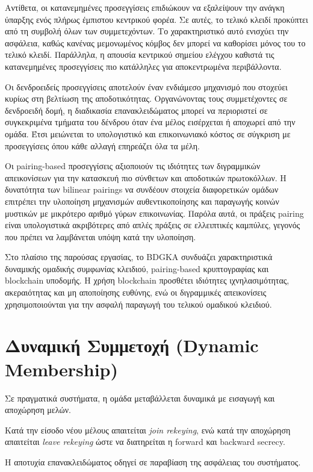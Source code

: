 \documentclass[12pt,a4paper]{report}
\begin{document}
Αντίθετα, οι κατανεμημένες προσεγγίσεις επιδιώκουν να εξαλείψουν την ανάγκη ύπαρξης ενός πλήρως έμπιστου κεντρικού φορέα. Σε αυτές, το τελικό κλειδί προκύπτει από τη συμβολή όλων των συμμετεχόντων. Το χαρακτηριστικό αυτό ενισχύει την ασφάλεια, καθώς κανένας μεμονωμένος κόμβος δεν μπορεί να καθορίσει μόνος του το τελικό κλειδί. Παράλληλα, η απουσία κεντρικού σημείου ελέγχου καθιστά τις κατανεμημένες προσεγγίσεις πιο κατάλληλες για αποκεντρωμένα περιβάλλοντα.

Οι δενδροειδείς προσεγγίσεις αποτελούν έναν ενδιάμεσο μηχανισμό που στοχεύει κυρίως στη βελτίωση της αποδοτικότητας. Οργανώνοντας τους συμμετέχοντες σε δενδροειδή δομή, η διαδικασία επανακλειδώματος μπορεί να περιοριστεί σε συγκεκριμένα τμήματα του δένδρου όταν ένα μέλος εισέρχεται ή αποχωρεί από την ομάδα. Έτσι μειώνεται το υπολογιστικό και επικοινωνιακό κόστος σε σύγκριση με προσεγγίσεις όπου κάθε αλλαγή επηρεάζει όλα τα μέλη.

Οι pairing-based προσεγγίσεις αξιοποιούν τις ιδιότητες των διγραμμικών απεικονίσεων για την κατασκευή πιο σύνθετων και αποδοτικών πρωτοκόλλων. Η δυνατότητα των bilinear pairings να συνδέουν στοιχεία διαφορετικών ομάδων επιτρέπει την υλοποίηση μηχανισμών αυθεντικοποίησης και παραγωγής κοινών μυστικών με μικρότερο αριθμό γύρων επικοινωνίας. Παρόλα αυτά, οι πράξεις pairing είναι υπολογιστικά ακριβότερες από απλές πράξεις σε ελλειπτικές καμπύλες, γεγονός που πρέπει να λαμβάνεται υπόψη κατά την υλοποίηση.

Στο πλαίσιο της παρούσας εργασίας, το BDGKA συνδυάζει χαρακτηριστικά δυναμικής ομαδικής συμφωνίας κλειδιού, pairing-based κρυπτογραφίας και blockchain υποδομής. Η χρήση blockchain προσθέτει ιδιότητες ιχνηλασιμότητας, ακεραιότητας και μη αποποίησης ευθύνης, ενώ οι διγραμμικές απεικονίσεις χρησιμοποιούνται για την ασφαλή παραγωγή του τελικού ομαδικού κλειδιού.


\section{Δυναμική Συμμετοχή (Dynamic Membership)}

Σε πραγματικά συστήματα, η ομάδα μεταβάλλεται δυναμικά με εισαγωγή και αποχώρηση μελών.

Κατά την είσοδο νέου μέλους απαιτείται \textit{join rekeying}, ενώ κατά την αποχώρηση απαιτείται \textit{leave rekeying} ώστε να διατηρείται η forward και backward secrecy.

Η αποτυχία επανακλειδώματος οδηγεί σε παραβίαση της ασφάλειας του συστήματος.
\end{document}
